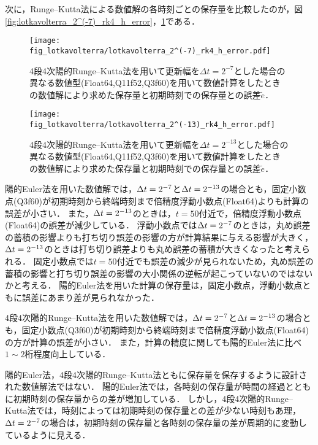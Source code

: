 次に，Runge--Kutta法による数値解の各時刻ごとの保存量を比較したのが，図\ref{fig:lotkavolterra_2^(-7)_rk4_h_error}，\ref{fig:lotkavolterra_2^(-13)_rk4_h_error}である．
\begin{figure}[H]
    \centering
    \begin{minipage}[b]{0.48\columnwidth}
        \centering
        \texttt{[image: fig\_lotkavolterra/lotkavolterra\_2^(-7)\_rk4\_h\_error.pdf]}
        \caption{4段4次陽的Runge--Kutta法を用いて更新幅を$\Delta t = 2^{-7}$とした場合の異なる数値型(Float64,Q11f52,Q3f60)を用いて数値計算をしたときの数値解により求めた保存量と初期時刻での保存量との誤差$\tilde{e}$．}
        \label{fig:lotkavolterra_2^(-7)_rk4_h_error}
    \end{minipage}
    \hspace{0.01\columnwidth}
    \begin{minipage}[b]{0.48\columnwidth}
        \centering
        \texttt{[image: fig\_lotkavolterra/lotkavolterra\_2^(-13)\_rk4\_h\_error.pdf]}
        \caption{4段4次陽的Runge--Kutta法を用いて更新幅を$\Delta t =  2^{-13}$とした場合の異なる数値型(Float64,Q11f52,Q3f60)を用いて数値計算をしたときの数値解により求めた保存量と初期時刻での保存量との誤差$\tilde{e}$．}
        \label{fig:lotkavolterra_2^(-13)_rk4_h_error}
    \end{minipage}
\end{figure}

陽的Euler法を用いた数値解では，$\Delta t = 2^{-7}$と$\Delta t = 2^{-13}$の場合とも，固定小数点(Q3f60)が初期時刻から終端時刻まで倍精度浮動小数点(Float64)よりも計算の誤差が小さい．
また，$\Delta t = 2^{-13}$のときは，$t=50$付近で，倍精度浮動小数点(Float64)の誤差が減少している．
浮動小数点では$\Delta t = 2^{-7}$のときは，丸め誤差の蓄積の影響よりも打ち切り誤差の影響の方が計算結果に与える影響が大きく，$\Delta t = 2^{-13}$のときは打ち切り誤差よりも丸め誤差の蓄積が大きくなったと考えられる．
固定小数点では$t = 50$付近でも誤差の減少が見られないため，丸め誤差の蓄積の影響と打ち切り誤差の影響の大小関係の逆転が起こっていないのではないかと考える．
陽的Euler法を用いた計算の保存量は，固定小数点，浮動小数点ともに誤差にあまり差が見られなかった．


4段4次陽的Runge--Kutta法を用いた数値解では，$\Delta t = 2^{-7}$と$\Delta t = 2^{-13}$の場合とも，固定小数点(Q3f60)が初期時刻から終端時刻まで倍精度浮動小数点(Float64)の方が計算の誤差が小さい．
また，計算の精度に関しても陽的Euler法に比べ$1 \sim 2$桁程度向上している．


陽的Euler法，4段4次陽的Runge--Kutta法ともに保存量を保存するように設計された数値解法ではない．
陽的Euler法では，各時刻の保存量が時間の経過とともに初期時刻の保存量からの差が増加している．
しかし，4段4次陽的Runge--Kutta法では，時刻によっては初期時刻の保存量との差が少ない時刻もあ理，$\Delta t = 2^{-7}$の場合は，初期時刻の保存量と各時刻の保存量の差が周期的に変動しているように見える．

